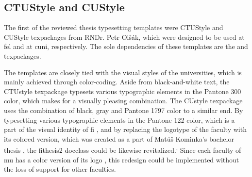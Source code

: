     \subsection{CTUStyle and CUStyle}\label{sec:ctu&custyle}
    The first of the reviewed thesis typesetting templates were CTUStyle \cite{ctustyle} and CUStyle \cite{custyle} \glspl{texpackage} from RNDr. Petr Olšák, which were designed to be used at \gls{fel} and at \gls{cuni}, respectively. The sole dependencies of these templates are the  and  \glspl{texpackage}.

    The templates are closely tied with the visual styles of the universities, which is mainly achieved through color-coding. Aside from black-and-white text, the CTUstyle \gls{texpackage} typesets various typographic elements in the  Pantone 300 color, which makes for a visually pleasing combination. The CUstyle \gls{texpackage} uses the combination of black, gray and  Pantone 1797 color to a similar end. By typesetting various typographic elements in the  Pantone 122 color, which is a part of the visual identity of \gls{fi} \cite{filogo}, and by replacing the logotype of the faculty with its colored version, which was created as a part of Matúš Kominka's bachelor thesis \cite{Kominka08}, the fithesis2 \gls{docclass} could be likewise revitalized.\textsuperscript{,} Since each faculty of \gls{mu} has a color version of its logo \cite{muvis}, this redesign could be implemented without the loss of support for other faculties.


